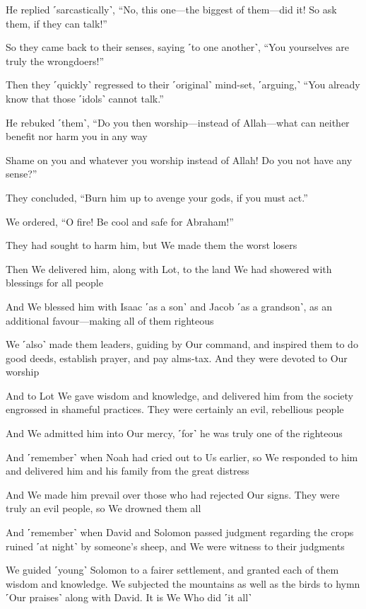 He replied ˹sarcastically˺, “No, this one—the biggest of them—did it! So ask them, if they can talk!”

So they came back to their senses, saying ˹to one another˺, “You yourselves are truly the wrongdoers!”

Then they ˹quickly˺ regressed to their ˹original˺ mind-set, ˹arguing,˺ “You already know that those ˹idols˺ cannot talk.”

He rebuked ˹them˺, “Do you then worship—instead of Allah—what can neither benefit nor harm you in any way

Shame on you and whatever you worship instead of Allah! Do you not have any sense?”

They concluded, “Burn him up to avenge your gods, if you must act.”

We ordered, “O fire! Be cool and safe for Abraham!”

They had sought to harm him, but We made them the worst losers

Then We delivered him, along with Lot, to the land We had showered with blessings for all people

And We blessed him with Isaac ˹as a son˺ and Jacob ˹as a grandson˺, as an additional favour—making all of them righteous

We ˹also˺ made them leaders, guiding by Our command, and inspired them to do good deeds, establish prayer, and pay alms-tax. And they were devoted to Our worship

And to Lot We gave wisdom and knowledge, and delivered him from the society engrossed in shameful practices. They were certainly an evil, rebellious people

And We admitted him into Our mercy, ˹for˺ he was truly one of the righteous

And ˹remember˺ when Noah had cried out to Us earlier, so We responded to him and delivered him and his family from the great distress

And We made him prevail over those who had rejected Our signs. They were truly an evil people, so We drowned them all

And ˹remember˺ when David and Solomon passed judgment regarding the crops ruined ˹at night˺ by someone’s sheep, and We were witness to their judgments

We guided ˹young˺ Solomon to a fairer settlement, and granted each of them wisdom and knowledge. We subjected the mountains as well as the birds to hymn ˹Our praises˺ along with David. It is We Who did ˹it all˺

